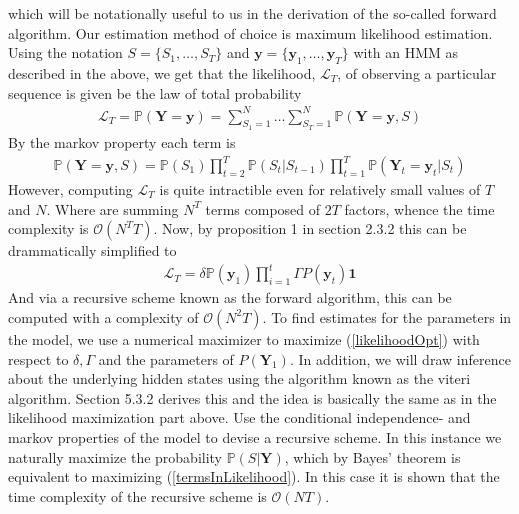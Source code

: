 which will be notationally useful to us in the derivation of the so-called forward algorithm. Our estimation method of choice is maximum likelihood estimation. Using the notation $S = \{S_1,\dots, S_T\}$ and $\mathbf{y} = \{\mathbf{y}_1,\dots, \mathbf{y}_T\}$ with an HMM as described in the above, we get that the likelihood, $\mathcal{L}_T$, of observing a particular sequence is given be the law of total probability
\begin{align}
    \mathcal{L}_T = \mathbb{P}(\mathbf{Y} = \mathbf{y}) = \sum_{S_1 = 1}^N\dots \sum_{S_T = 1}^N \mathbb{P}(\mathbf{Y} = \mathbf{y}, S)
\end{align}
By the markov property each term is
\begin{align}
    \mathbb{P}(\mathbf{Y} = \mathbf{y}, S) = \mathbb{P}(S_1)\prod_{t = 2}^T \mathbb{P}(S_t | S_{t-1})\prod_{t = 1}^T \mathbb{P}(\mathbf{Y}_t = \mathbf{y}_t | S_t) 
    \label{termsInLikelihood}
\end{align}
However, computing $\mathcal{L}_T$ is quite intractible even for relatively small values of $T$ and $N$. Where are summing $N^T$ terms composed of $2T$ factors, whence the time complexity is $\mathcal{O}\left(N^TT\right)$. Now, by proposition 1 in section 2.3.2 \cite{HHMForTimesSeries} this can be drammatically simplified to
\begin{align}
    \mathcal{L}_T = \delta\mathbb{P}(\mathbf{y}_1)\prod_{i = 1}^{t}\Gamma P(\mathbf{y}_t)\mathbf{1}
    \label{likelihoodOpt}
\end{align}
And via a recursive scheme known as the forward algorithm, this can be computed with a complexity of $\mathcal{O}(N^2T)$. To find estimates for the parameters in the model, we use a numerical maximizer to maximize (\ref{likelihoodOpt}) with respect to $\delta, \Gamma$ and the parameters of $P(\mathbf{Y}_1)$. In addition, we will draw inference about the underlying hidden states using the algorithm known as the viteri algorithm. Section 5.3.2 \cite{HHMForTimesSeries}  derives this and the idea is basically the same as in the likelihood maximization part above. Use the conditional independence- and markov properties of the model to devise a recursive scheme. In this instance we naturally maximize the probability $\mathbb{P}(S | \mathbf{Y})$, which by Bayes' theorem is equivalent to maximizing (\ref{termsInLikelihood}). In this case it is shown that the time complexity of the recursive scheme is $\mathcal{O}(NT)$.